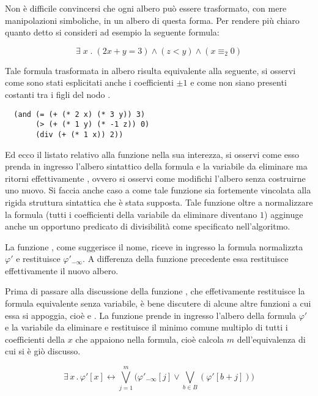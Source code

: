 \documentclass[11pt,letterpaper,twoside]{article}
\begin{document}
Non è difficile convincersi che ogni albero può essere trasformato, con mere
manipolazioni simboliche, in un albero di questa forma. Per rendere più chiaro
quanto detto si consideri ad esempio la seguente formula:

$$ \exists \; x \; . \; (2x + y = 3) \land (z < y) \land (x \equiv_{2} 0) $$

Tale formula trasformata in albero risulta equivalente alla seguente, si osservi
come sono stati esplicitati anche i coefficienti $\pm 1$ e come non siano
presenti costanti tra i figli del nodo \inline{+}.

\begin{verbatim}
  (and (= (+ (* 2 x) (* 3 y)) 3)
       (> (+ (* 1 y) (* -1 z)) 0)
       (div (+ (* 1 x)) 2))
\end{verbatim}

Ed ecco il listato relativo alla funzione  nella
sua interezza, si osservi come esso prenda in ingresso l'albero sintattico della
formula e la variabile da eliminare ma ritorni effettivamente ,
ovvero si osservi come modifichi l'albero senza costruirne uno nuovo. Si faccia
anche caso a come tale funzione sia fortemente vincolata alla rigida struttura
sintattica che è stata supposta. Tale funzione oltre a normalizzare la formula
(tutti i coefficienti della variabile da eliminare diventano $1$) agginuge anche
un opportuno predicato di divisibilità come specificato nell'algoritmo.


La funzione , come suggerisce il nome, riceve in ingresso la
formula normalizzta $\varphi'$ e restituisce $\varphi'_{- \infty}$. A differenza
della funzione precedente essa restituisce effettivamente il nuovo albero.


Prima di passare alla discussione della funzione , che
effetivamente restituisce la formula equivalente senza variabile, è bene
discutere di alcune altre funzioni a cui essa si appoggia, cioè  e
.
La funzione  prende in ingresso
l'albero della formula $\varphi'$ e la variabile da eliminare e restituisce il
minimo comune multiplo di tutti i coefficienti della $x$ che appaiono nella
formula, cioè calcola $m$ dell'equivalenza di cui si è giò discusso.

$$ \exists \, x \, . \, \varphi'[x] \longleftrightarrow \bigvee_{j=1}^m \Big(
\varphi'_{- \infty}[j] \lor \bigvee_{b \in B}(\varphi'[b+j]) \Big)$$
\end{document}
